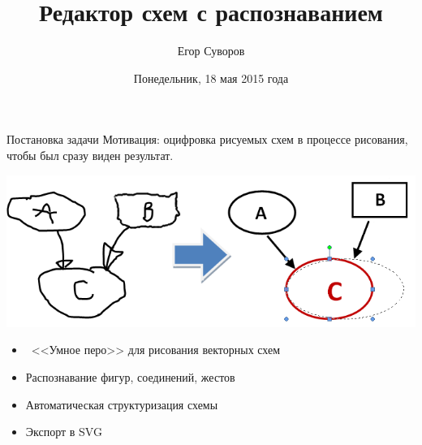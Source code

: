 \documentclass[utf8,xcolor=table]{beamer}
\title{Редактор схем с распознаванием}
\author{Егор Суворов}
\institute[CSCenter]{Практика, осень 2014 -- весна 2015\\Куратор: Евгений Линский}
\date[18.05.2015]{Понедельник, 18 мая 2015 года}
\begin{document}
\begin{frame}
\titlepage
\end{frame}

\begin{frame}[t]{Постановка задачи}
  Мотивация: оцифровка рисуемых схем в процессе рисования,
  чтобы был сразу виден результат.

  \includegraphics[width=\textwidth]{problem}
  \begin{itemize}
  \item~<<Умное перо>> для рисования векторных схем
  \item Распознавание фигур, соединений, жестов
  \item Автоматическая структуризация схемы
  \item Экспорт в SVG
  \end{itemize}
\end{frame}
\end{document}

